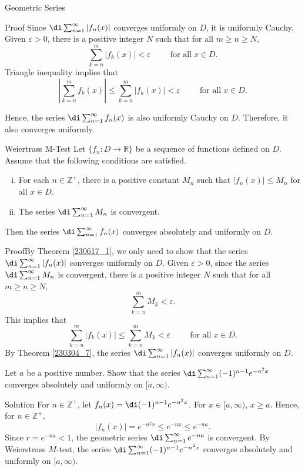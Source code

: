 \begin{example}[label=230305_16]{Geometric Series}
\begin{example}[label=230304_9]{}
\begin{myproof}{Proof}
Since   $\di\sum_{n=1}^{\infty}|f_n(x)|$ converges uniformly on $D$, it is uniformly Cauchy. Given $\varepsilon>0$, there is a positive integer $N$ such that for all $m\geq n\geq N$,
\[\sum_{k=n}^m|f_k(x)|<\varepsilon \hspace{1cm}\text{for all}\;x\in D.\]
Triangle inequality implies that
\[\left|\sum_{k=n}^mf_k(x)\right|\leq \sum_{k=n}^m|f_k(x)|<\varepsilon \hspace{1cm}\text{for all}\;x\in D.\]
 
Hence, the series $\di\sum_{n=1}^{\infty}f_n(x)$ is also uniformly Cauchy on $D$. Therefore, it also converges uniformly.
\end{myproof}
\begin{theorem}[label=230305_8]{Weiertrass M-Test}
Let $\{f_n:D\to \mathbb{R}\}$ be a sequence of functions defined on $D$. Assume that the following conditions are satisfied.
\begin{enumerate}[(i)]
\item
For each $n\in\mathbb{Z}^+$, there is a positive constant $M_n$ such that $|f_n(x)|\leq M_n$ for all $x\in D$.
\item The series $\di\sum_{n=1}^{\infty}M_n$ is convergent.
\end{enumerate}Then the series $\di\sum_{n=1}^{\infty}f_n(x)$ converges absolutely and uniformly on $D$. 
\end{theorem}
\begin{myproof}{Proof}By Theorem \ref{230617_1}, we only
 need to show that the series $\di\sum_{n=1}^{\infty}|f_n(x)|$ converges uniformly on $D$.
Given $\varepsilon>0$, since the series $\di\sum_{n=1}^{\infty}M_n$ is convergent, there is a positive integer $N$ such that for all $m\geq n\geq N$,
\[ \sum_{k=n}^m M_k<\varepsilon.\]This implies that
\[\sum_{k=n}^m|f_k(x)|\leq\sum_{k=n}^mM_k<\varepsilon\hspace{1cm}\text{for all}\;x\in D.\]
By Theorem \ref{230304_7}, the series  $\di\sum_{n=1}^{\infty}|f_n(x)|$ converges uniformly on $D$.
\end{myproof}

\begin{example}{}
Let $a$ be a positive number. Show that the series  $\di\sum_{n=1}^{\infty}(-1)^{n-1}e^{-n^2x}$ converges absolutely and  uniformly on $[a,\infty)$.  
\end{example}
\begin{solution}{Solution}
For $n\in\mathbb{Z}^+$, let $f_n(x)=\di (-1)^{n-1}e^{-n^2x}$. For $x\in [a, \infty)$, $x\geq a$. Hence, for $n\in\mathbb{Z}^+$,
\[|f_n(x)|=e^{-n^2x}\leq e^{-nx}\leq e^{-na}.\]
Since $r=e^{-na}<1$, the geometric series $\di\sum_{n=1}^{\infty} e^{-na}$ is convergent. By Weierstrass $M$-test, the series $\di\sum_{n=1}^{\infty}(-1)^{n-1}e^{-n^2x}$ converges absolutely and  uniformly on $[a,\infty)$. 
\end{solution}


\end{example}
\end{example}
